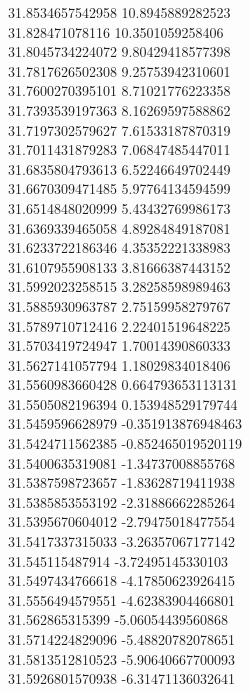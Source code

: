 {31.8534657542958	10.8945889282523\\
31.828471078116	10.3501059258406\\
31.8045734224072	9.80429418577398\\
31.7817626502308	9.25753942310601\\
31.7600270395101	8.71021776223358\\
31.7393539197363	8.16269597588862\\
31.7197302579627	7.61533187870319\\
31.7011431879283	7.06847485447011\\
31.6835804793613	6.52246649702449\\
31.6670309471485	5.97764134594599\\
31.6514848020999	5.43432769986173\\
31.6369339465058	4.89284849187081\\
31.6233722186346	4.35352221338983\\
31.6107955908133	3.81666387443152\\
31.5992023258515	3.28258598989463\\
31.5885930963787	2.75159958279767\\
31.5789710712416	2.22401519648225\\
31.5703419724947	1.70014390860333\\
31.5627141057794	1.18029834018406\\
31.5560983660428	0.664793653113131\\
31.5505082196394	0.153948529179744\\
31.5459596628979	-0.351913876948463\\
31.5424711562385	-0.852465019520119\\
31.5400635319081	-1.34737008855768\\
31.5387598723657	-1.83628719411938\\
31.5385853553192	-2.31886662285264\\
31.5395670604012	-2.79475018477554\\
31.5417337315033	-3.26357067177142\\
31.545115487914	-3.72495145330103\\
31.5497434766618	-4.17850623926415\\
31.5556494579551	-4.62383904466801\\
31.562865315399	-5.06054439560868\\
31.5714224829096	-5.48820782078651\\
31.5813512810523	-5.90640667700093\\
31.5926801570938	-6.31471136032641\\
}
